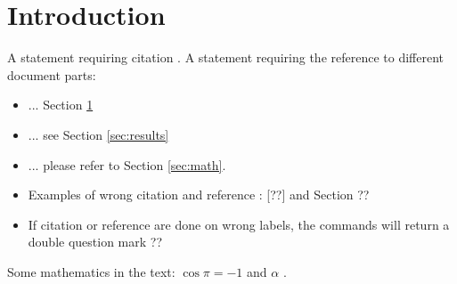 \section{Introduction}
\label{sec:introduction}

A statement requiring citation \cite{Figueredo:2009dg}. A statement requiring the reference to different document parts:
\begin{itemize}
	\item ... Section \ref{sec:introduction}
	\item ... see Section \ref{sec:results}
	\item ... please refer to Section \ref{sec:math}.
	\item Examples of wrong citation and reference : [??] and Section ??
	\item If citation or reference are done on wrong labels, the commands will return a double question mark ??
\end{itemize}

\lipsum[1-2] %

Some mathematics in the text: $\cos\pi=-1$ and $\alpha$ \cite{Figueredo:2009dg}.